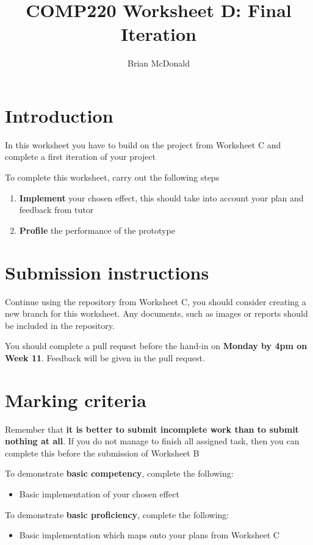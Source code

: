 \documentclass{../../../fal_assignment}
\title{COMP220 Worksheet D: Final Iteration}
\author{Brian McDonald}
\begin{document}
\maketitle

\section*{Introduction}

In this worksheet you have to build on the project from Worksheet C and complete a first iteration of your project

To complete this worksheet, carry out the following steps
\begin{enumerate}[label=(\alph*)]
	\item \textbf{Implement} your chosen effect, this should take into account your plan and feedback from tutor
	\item \textbf{Profile} the performance of the prototype
\end{enumerate}

\section*{Submission instructions}

Continue using the repository from Worksheet C, you should consider creating a new branch for this worksheet. Any documents, such as images or reports should be included in the repository.

You should complete a pull request before the hand-in on \textbf{Monday by 4pm on Week 11}. Feedback will be given in the pull request.

\section*{Marking criteria}

Remember that \textbf{it is better to submit incomplete work than to submit nothing at all}. If you do not manage to finish all assigned task, then you can complete this before the submission of Worksheet B

To demonstrate \textbf{basic competency}, complete the following:
\begin{itemize}
	\item Basic implementation of your chosen effect
\end{itemize} 

To demonstrate \textbf{basic proficiency}, complete the following:
\begin{itemize}
	\item Basic implementation which maps onto your plans from Worksheet C
\end{itemize}
\end{document}
